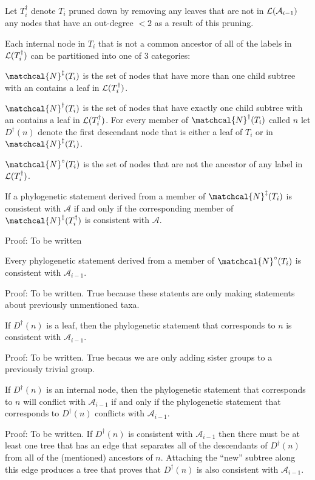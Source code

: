 \documentclass[11pt]{article}
\begin{document}
Let $T_i^{\dag}$ denote $T_i$ pruned down by removing any leaves that are not in $\mathcal{L}(\mathcal{A}_{i-1})$  any nodes that have an out-degree $<2$ as a result of this pruning.


Each internal node in $T_i$ that is not a common ancestor of all of the labels in $\mathcal{L}(T_i^{\dag})$ can be partitioned into one of 3 categories:
\begin{compactenum}
    \item $\matchcal{N}^{\ddag}(T_i)$ is the set of nodes that have more than one child subtree with an contains a leaf in $\mathcal{L}(T_i^{\dag})$.
    \item $\matchcal{N}^{\dag}(T_i)$ is the set of nodes that have exactly one child subtree with an contains a leaf in $\mathcal{L}(T_i^{\dag})$.
    For every member of $\matchcal{N}^{\dag}(T_i)$ called $n$ let $D^{\dag}(n)$ denote the first descendant node that is either a leaf of $T_i$ or in $\matchcal{N}^{\ddag}(T_i)$.
    \item $\matchcal{N}^{\circ}(T_i)$ is the set of nodes that are not the ancestor of any label in $\mathcal{L}(T_i^{\dag})$.
\end{compactenum}


\begin{theorem}
If a phylogenetic statement derived from a member of $\matchcal{N}^{\ddag}(T_i)$ is consistent with  $\mathcal{A}$ if and only if the corresponding member of $\matchcal{N}^{\ddag}(T_i^{\dag})$ is consistent with  $\mathcal{A}$.
\end{theorem}
Proof: To be written


\begin{theorem}
Every phylogenetic statement derived from a member of $\matchcal{N}^{\circ}(T_i)$ is consistent with  $\mathcal{A}_{i-1}$.
\end{theorem}
Proof: To be written. True because these statents are only making statements about previously unmentioned taxa.

\begin{theorem}
If $D^{\dag}(n)$ is a leaf, then the phylogenetic statement that corresponds
    to $n$ is consistent with $\mathcal{A}_{i-1}$.
\end{theorem}
Proof: To be written. True becaus we are only adding sister groups to a previously trivial group.


\begin{theorem}
If $D^{\dag}(n)$ is an internal node, then the phylogenetic statement
    that corresponds to $n$ will conflict with $\mathcal{A}_{i-1}$ if
    and only if the phylogenetic statement that corresponds to 
    $D^{\dag}(n)$ conflicts with $\mathcal{A}_{i-1}$.
\end{theorem}
Proof: To be written. If $D^{\dag}(n)$ is consistent with $\mathcal{A}_{i-1}$
then there must be at least one tree that has an edge that separates all of the 
descendants of $D^{\dag}(n)$ from all of the (mentioned) ancestors
of $n$.
Attaching the ``new'' subtree along this edge produces a tree that proves that 
  $D^{\dag}(n)$ is also consistent with $\mathcal{A}_{i-1}$.
\end{document}

